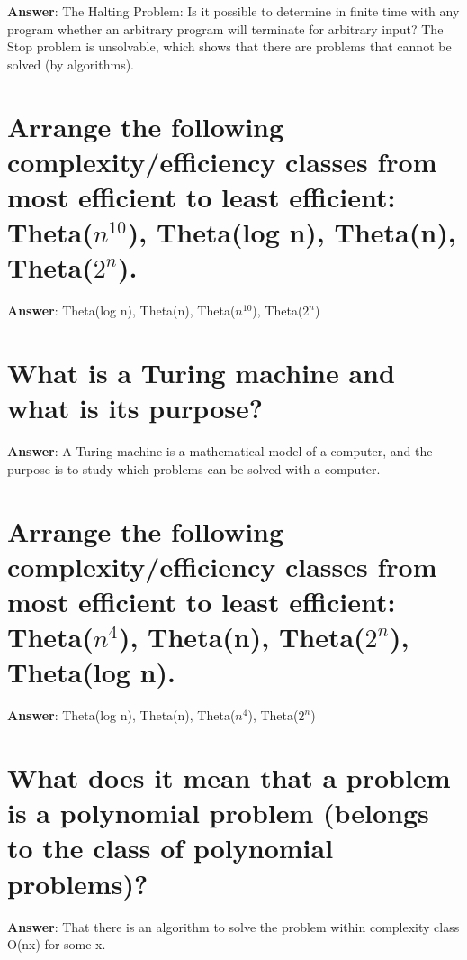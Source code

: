 \documentclass[a4paper,11pt,oneside]{book}
\begin{document}
\begin{sloppypar}
\label{q:331:sa:en:True}

\textbf{Answer}: The Halting Problem: Is it possible to determine in finite time with any program whether an arbitrary program will terminate for arbitrary input? The Stop problem is unsolvable, which shows that there are problems that cannot be solved (by algorithms).



\section{Arrange the following complexity/efficiency classes from most efficient to least efficient: Theta($n^10$), Theta(log n), Theta(n), Theta($2^n$).}

\label{q:332:sa:en:True}

\textbf{Answer}: Theta(log n), Theta(n), Theta($n^10$), Theta($2^n$)



\section{What is a Turing machine and what is its purpose?}

\label{q:333:sa:en:True}

\textbf{Answer}: A Turing machine is a mathematical model of a computer, and the purpose is to study which problems can be solved with a computer.



\section{Arrange the following complexity/efficiency classes from most efficient to least efficient: Theta($n^4$), Theta(n), Theta($2^n$), Theta(log n).}

\label{q:334:sa:en:True}

\textbf{Answer}: Theta(log n), Theta(n), Theta($n^4$), Theta($2^n$)



\section{What does it mean that a problem is a polynomial problem (belongs to the class of polynomial problems)?}

\label{q:335:sa:en:True}

\textbf{Answer}: That there is an algorithm to solve the problem within complexity class O(nx) for some x.




\end{sloppypar}
\end{document}
